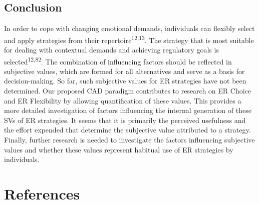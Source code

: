 \documentclass[
  man,floatsintext]{apa6}
\begin{document}
\hypertarget{conclusion}{%
\subsection{Conclusion}\label{conclusion}}

In order to cope with changing emotional demands, individuals can flexibly select and apply strategies from their repertoire\textsuperscript{12,13}.
The strategy that is most suitable for dealing with contextual demands and achieving regulatory goals is selected\textsuperscript{12,82}.
The combination of influencing factors should be reflected in subjective values, which are formed for all alternatives and serve as a basis for decision-making.
So far, such subjective values for ER strategies have not been determined.
Our proposed CAD paradigm contributes to research on ER Choice and ER Flexibility by allowing quantification of these values.
This provides a more detailed investigation of factors influencing the internal generation of these SVs of ER strategies.
It seems that it is primarily the perceived usefulness and the effort expended that determine the subjective value attributed to a strategy.
Finally, further research is needed to investigate the factors influencing subjective values and whether these values represent habitual use of ER strategies by individuals.

\hypertarget{references}{%
\section{References}\label{references}}

\begingroup
\setlength{\parindent}{-0.5in}
\setlength{\leftskip}{0.5in}
\end{document}
